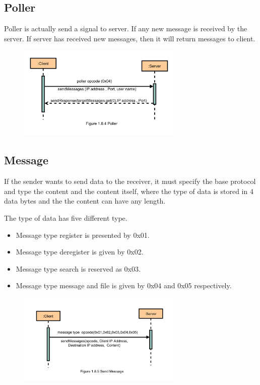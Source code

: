     \subsection{Poller}\label{subsec:poller}
    Poller is actually  send a signal to server.
    If any new message is received by the server.
    If server has received new messages, then it will return messages to client.
    
			    \begin{figure}
			    	\centering
			    	\includegraphics[width=0.7\textwidth]{gfx/1.8.4_Poller}
			    	\label{fig:rpoller}
			    \end{figure}


    \subsection{Message}\label{subsec:message}
    If the sender wants to send data to the receiver, it must specify the base protocol and type
    the content and the content itself, where the type of data is stored in 4 data bytes and the
    the content can have any length.
    \medskip

    \noindent

 
    The type of  data has five different type.
    \begin{itemize}
    	\item Message type register is presented by 0x01.
    	\item Message type deregister is given  by 0x02.
    	\item Message type search is reserved as 0x03.
    	\item Message type message and file is given by 0x04 and 0x05 respectively.
    \end{itemize}

			\begin{figure}
				\centering
				\includegraphics[width=0.7\textwidth]{gfx/1.8.5_Send_Opcode_Message}
				\label{fig:send-opcode-message}
			\end{figure}

